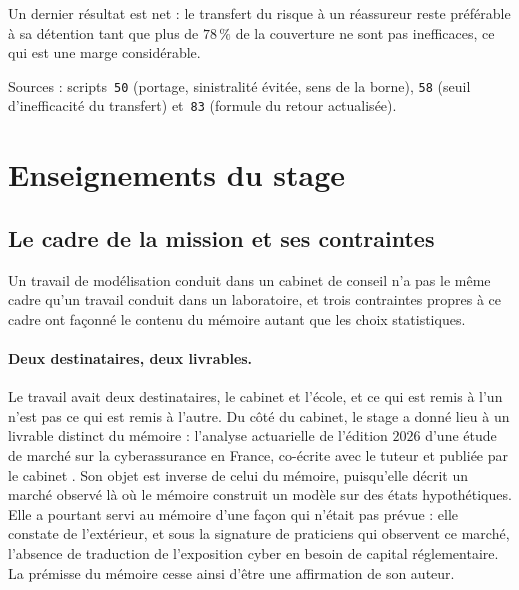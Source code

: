 \documentclass[12pt,a4paper]{article}
\theoremstyle{definition}
\begin{document}
Un dernier résultat est net : le transfert du risque
à un réassureur reste préférable à sa détention tant que plus de $78\,\%$ de la
couverture ne sont pas inefficaces, ce qui est une marge considérable.

\vspace{4pt}
\noindent Sources : scripts~\texttt{50} (portage, sinistralité évitée, sens de la
borne), \texttt{58} (seuil d'inefficacité du transfert) et~\texttt{83} (formule du
retour actualisée).

\section{Enseignements du stage}
\label{s:recul}

\subsection{Le cadre de la mission et ses contraintes}
\label{ss:cadre}

Un travail de modélisation conduit dans un cabinet de conseil n'a pas le même
cadre qu'un travail conduit dans un laboratoire, et trois contraintes propres à ce
cadre ont façonné le contenu du mémoire autant que les choix statistiques.

\paragraph{Deux destinataires, deux livrables.} Le travail avait deux
destinataires, le cabinet et l'école, et ce qui est remis à l'un n'est pas ce qui
est remis à l'autre. Du côté du cabinet, le stage a donné lieu à un livrable
distinct du mémoire : l'analyse actuarielle de l'édition $2026$ d'une étude de
marché sur la cyberassurance en France, co-écrite avec le tuteur et publiée par le
cabinet \citep{RapiorKaddouri2026}. Son objet est inverse de celui du mémoire,
puisqu'elle décrit un marché observé là où le mémoire construit un modèle sur des
états hypothétiques. Elle a pourtant servi au mémoire d'une façon qui n'était pas
prévue : elle constate de l'extérieur, et sous la signature de praticiens qui
observent ce marché, l'absence de traduction de l'exposition cyber en besoin de
capital réglementaire. La prémisse du mémoire cesse ainsi d'être une affirmation
de son auteur.
\end{document}
